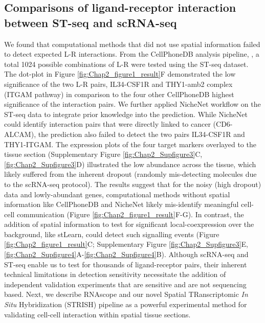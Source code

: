 \subsection{Comparisons of ligand-receptor interaction between ST-seq and scRNA-seq}
We found that computational methods that did not use spatial information failed to detect expected L-R interactions. From the CellPhoneDB analysis pipeline, \cite{efremova2020cellphonedb}, a total 1024 possible combinations of L-R were tested using the ST-seq dataset. The dot-plot in Figure \ref{fig:Chap2_figure1_result}F demonstrated the low significance of the two L-R pairs, IL34-CSF1R and THY1-amb2 complex (ITGAM pathway) in comparison to the four other CellPhoneDB highest significance of the interaction pairs. We further applied NicheNet \cite{browaeys2020nichenet} workflow on the ST-seq data to integrate prior knowledge into the prediction. While NicheNet could identify interaction pairs that were directly linked to cancer (\ie CD6-ALCAM), the prediction also failed to detect the two pairs IL34-CSF1R and THY1-ITGAM. The expression plots of the four target markers overlayed to the tissue section (Supplementary Figure \ref{fig:Chap2_Supfigure3}C, \ref{fig:Chap2_Supfigure3}D) illustrated the low abundance across the tissue, which likely suffered from the inherent dropout (randomly mis-detecting molecules due to the scRNA-seq protocol). The results suggest that for the noisy (high dropout) data and lowly-abundant genes, computational methods without spatial information like CellPhoneDB and NicheNet likely mis-identify meaningful cell-cell communication (Figure \ref{fig:Chap2_figure1_result}F-G). In contrast, the addition of spatial information to test for significant local-coexpression over the background, like stLearn, could detect such signalling events (Figure \ref{fig:Chap2_figure1_result}C; Supplementary Figure \ref{fig:Chap2_Supfigure3}E,  \ref{fig:Chap2_Supfigure4}A-\ref{fig:Chap2_Supfigure4}B). Although scRNA-seq and ST-seq enable us to test for thousands of ligand-receptor pairs, their inherent technical limitations in detection sensitivity necessitate the addition of independent validation experiments that are sensitive and are not sequencing based. Next, we describe RNAscope and our novel Spatial TRanscriptomic \textit{In Situ} Hybridization (STRISH) pipeline as a powerful experimental method for validating cell-cell interaction within spatial tissue sections. 

